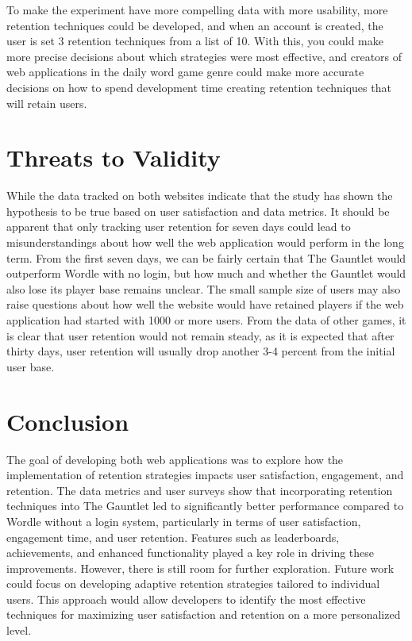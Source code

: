 To make the experiment have more compelling data with more usability, more retention techniques could be developed, and when an account is created, the user is set 3 retention techniques from a list of 10. With this, you could make more precise decisions about which strategies were most effective, and creators of web applications in the daily word game genre could make more accurate decisions on how to spend development time creating retention techniques that will retain users. 

\section{Threats to Validity}
While the data tracked on both websites indicate that the study has shown the hypothesis to be true based on user satisfaction and data metrics. It should be apparent that only tracking user retention for seven days could lead to misunderstandings about how well the web application would perform in the long term. From the first seven days, we can be fairly certain that The Gauntlet would outperform Wordle with no login, but how much and whether the Gauntlet would also lose its player base remains unclear. 
The small sample size of users may also raise questions about how well the website would have retained players if the web application had started with 1000 or more users. From the data of other games, it is clear that user retention would not remain steady, as it is expected that after thirty days, user retention will usually drop another 3-4 percent from the initial user base.\cite{mistplay2024}

\section{Conclusion}
The goal of developing both web applications was to explore how the implementation of retention strategies impacts user satisfaction, engagement, and retention. The data metrics and user surveys show that incorporating retention techniques into The Gauntlet led to significantly better performance compared to Wordle without a login system, particularly in terms of user satisfaction, engagement time, and user retention. Features such as leaderboards, achievements, and enhanced functionality played a key role in driving these improvements. However, there is still room for further exploration. Future work could focus on developing adaptive retention strategies tailored to individual users. This approach would allow developers to identify the most effective techniques for maximizing user satisfaction and retention on a more personalized level.